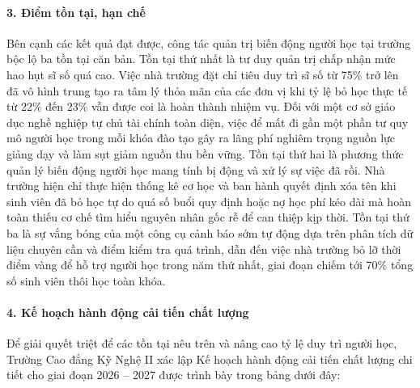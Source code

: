 \paragraph{3. Điểm tồn tại, hạn chế}
Bên cạnh các kết quả đạt được, công tác quản trị biến động người học tại trường bộc lộ ba tồn tại căn bản. Tồn tại thứ nhất là tư duy quản trị chấp nhận mức hao hụt sĩ số quá cao. Việc nhà trường đặt chỉ tiêu duy trì sĩ số từ 75\% trở lên đã vô hình trung tạo ra tâm lý thỏa mãn của các đơn vị khi tỷ lệ bỏ học thực tế từ 22\% đến 23\% vẫn được coi là hoàn thành nhiệm vụ. Đối với một cơ sở giáo dục nghề nghiệp tự chủ tài chính toàn diện, việc để mất đi gần một phần tư quy mô người học trong mỗi khóa đào tạo gây ra lãng phí nghiêm trọng nguồn lực giảng dạy và làm sụt giảm nguồn thu bền vững. Tồn tại thứ hai là phương thức quản lý biến động người học mang tính bị động và xử lý sự việc đã rồi. Nhà trường hiện chỉ thực hiện thống kê cơ học và ban hành quyết định xóa tên khi sinh viên đã bỏ học tự do quá số buổi quy định hoặc nợ học phí kéo dài mà hoàn toàn thiếu cơ chế tìm hiểu nguyên nhân gốc rễ để can thiệp kịp thời. Tồn tại thứ ba là sự vắng bóng của một công cụ cảnh báo sớm tự động dựa trên phân tích dữ liệu chuyên cần và điểm kiểm tra quá trình, dẫn đến việc nhà trường bỏ lỡ thời điểm vàng để hỗ trợ người học trong năm thứ nhất, giai đoạn chiếm tới 70\% tổng số sinh viên thôi học toàn khóa.

\paragraph{4. Kế hoạch hành động cải tiến chất lượng}
Để giải quyết triệt để các tồn tại nêu trên và nâng cao tỷ lệ duy trì người học, Trường Cao đẳng Kỹ Nghệ II xác lập Kế hoạch hành động cải tiến chất lượng chi tiết cho giai đoạn 2026 -- 2027 được trình bày trong bảng dưới đây:

